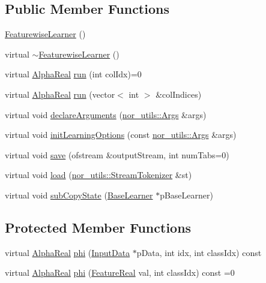 \subsection*{Public Member Functions}
\begin{DoxyCompactItemize}
\item 
\hyperlink{classMultiBoost_1_1FeaturewiseLearner_a6a884b40e41539f46a0432655b29e78c}{FeaturewiseLearner} ()
\item 
virtual \hyperlink{classMultiBoost_1_1FeaturewiseLearner_a58a5d780b4db7aae3f3552925093b5ce}{$\sim$FeaturewiseLearner} ()
\item 
virtual \hyperlink{Defaults_8h_a80184c4fd10ab70a1a17c5f97dcd1563}{AlphaReal} \hyperlink{classMultiBoost_1_1FeaturewiseLearner_a534117f1fd7727e54fbef8594e187d04}{run} (int colIdx)=0
\item 
virtual \hyperlink{Defaults_8h_a80184c4fd10ab70a1a17c5f97dcd1563}{AlphaReal} \hyperlink{classMultiBoost_1_1FeaturewiseLearner_a2813c451210fc9d4fb4cf96216bcc813}{run} (vector$<$ int $>$ \&colIndices)
\item 
virtual void \hyperlink{classMultiBoost_1_1FeaturewiseLearner_a355e35d792aaae83f9e639b8cb5ab2a4}{declareArguments} (\hyperlink{classnor__utils_1_1Args}{nor\_\-utils::Args} \&args)
\item 
virtual void \hyperlink{classMultiBoost_1_1FeaturewiseLearner_a24d0666de1f394b2165c2d833d36b5f6}{initLearningOptions} (const \hyperlink{classnor__utils_1_1Args}{nor\_\-utils::Args} \&args)
\item 
virtual void \hyperlink{classMultiBoost_1_1FeaturewiseLearner_acbe3dd6b71be522672859e9c1d7745e7}{save} (ofstream \&outputStream, int numTabs=0)
\item 
virtual void \hyperlink{classMultiBoost_1_1FeaturewiseLearner_a6de379273861d743cd85d6ea2abb20a3}{load} (\hyperlink{classnor__utils_1_1StreamTokenizer}{nor\_\-utils::StreamTokenizer} \&st)
\item 
virtual void \hyperlink{classMultiBoost_1_1FeaturewiseLearner_a31c71079d30d1d7c81624a6e789a3a24}{subCopyState} (\hyperlink{classMultiBoost_1_1BaseLearner}{BaseLearner} $\ast$pBaseLearner)
\end{DoxyCompactItemize}
\subsection*{Protected Member Functions}
\begin{DoxyCompactItemize}
\item 
virtual \hyperlink{Defaults_8h_a80184c4fd10ab70a1a17c5f97dcd1563}{AlphaReal} \hyperlink{classMultiBoost_1_1FeaturewiseLearner_ac69d42c7eb83a3496ad4cee9b0781b84}{phi} (\hyperlink{classMultiBoost_1_1InputData}{InputData} $\ast$pData, int idx, int classIdx) const 
\item 
virtual \hyperlink{Defaults_8h_a80184c4fd10ab70a1a17c5f97dcd1563}{AlphaReal} \hyperlink{classMultiBoost_1_1FeaturewiseLearner_a76a3ea26da7434ebb2b48415cc83fa12}{phi} (\hyperlink{Defaults_8h_a3a11cfe6a5d469d921716ca6291e934f}{FeatureReal} val, int classIdx) const =0
\end{DoxyCompactItemize}
